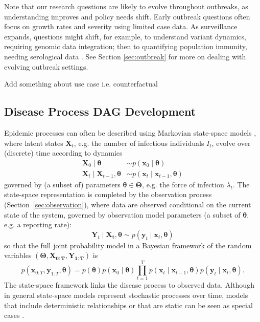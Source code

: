 \documentclass{article}
\begin{document}
Note that our research questions are likely to evolve throughout outbreaks, as understanding improves and policy needs shift. Early outbreak questions often focus on growth rates and severity using limited case data. As surveillance expands, questions might shift, for example, to understand variant dynamics, requiring genomic data integration; then to quantifying population immunity, needing serological data \citep{bhatia2023lessons,shearer2024opportunities}. See Section \ref{sec:outbreak} for more on dealing with evolving outbreak settings.

Add something about use case i.e. counterfactual

\subsection{Disease Process DAG Development} \label{sec:process}

Epidemic processes can often be described using Markovian state-space models \citep{birrell2018evidence}, where latent states $\boldsymbol{X}_t$, e.g. the number of infectious individuals $I_t$, evolve over (discrete) time according to dynamics 
\begin{align*}
\boldsymbol{X}_{0} \mid \boldsymbol{\theta} & \sim p(\boldsymbol{x}_0 \mid \boldsymbol{\theta}) \\
\boldsymbol{X}_{t} \mid \boldsymbol{X}_{t-1}, \boldsymbol{\theta} & \sim p(\boldsymbol{x}_t \mid \boldsymbol{x}_{t-1}, \boldsymbol{\theta})
\end{align*}
governed by (a subset of) parameters $\boldsymbol{\theta} \in \boldsymbol{\Theta}$, e.g. the force of infection $\lambda_t$. The state-space representation is completed by the observation process (Section~\ref{sec:observation}), where data are observed conditional on the current state of the system, governed by observation model parameters (a subset of $\boldsymbol{\theta}$, e.g. a reporting rate):
$$
\boldsymbol{Y}_{t} \mid \boldsymbol{X_t}, \boldsymbol{\theta} \sim p(\boldsymbol{y}_t \mid \boldsymbol{x}_t, \boldsymbol{\theta}) 
$$
so that the full joint probability model in a Bayesian framework of the random variables $(\boldsymbol{\Theta}, \boldsymbol{X_{0:T}}
, \boldsymbol{Y_{1:T}})$ is
$$
p(\boldsymbol{x}_{0:T}, \boldsymbol{y}_{1:T} , \boldsymbol{\theta}) = p(\boldsymbol{\theta})p(\boldsymbol{x}_0 \mid \boldsymbol{\theta})\prod_{t=1}^T p(\boldsymbol{x}_t \mid \boldsymbol{x}_{t-1}, \boldsymbol{\theta})p(\boldsymbol{y}_t \mid \boldsymbol{x}_t, \boldsymbol{\theta}).
$$
The state-space framework links the disease process to observed data. Although in general state-space models represent stochastic processes over time, models that include deterministic relationships or that are static can be seen as special cases \citep{birrell2018evidence}. 
\end{document}
